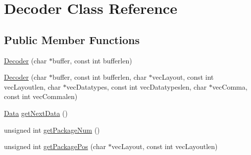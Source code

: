 \hypertarget{classDecoder}{\section{Decoder Class Reference}
\label{classDecoder}
}
\subsection*{Public Member Functions}
\begin{DoxyCompactItemize}
\item 
\hyperlink{classDecoder_a26cf61527451080d86ac5f876d3d1c21}{Decoder} (char $\ast$buffer, const int bufferlen)
\item 
\hyperlink{classDecoder_aec7e24d0fc7ac86886fc7f5de4999ed5}{Decoder} (char $\ast$buffer, const int bufferlen, char $\ast$vec\-Layout, const int vec\-Layoutlen, char $\ast$vec\-Datatypes, const int vec\-Datatypeslen, char $\ast$vec\-Comma, const int vec\-Commalen)
\item 
\hyperlink{classData}{Data} \hyperlink{classDecoder_a822e353ce4fda29290f280d4e3e44305}{get\-Next\-Data} ()
\item 
unsigned int \hyperlink{classDecoder_a28231d06fe2fd5144a939907d6ee509a}{get\-Package\-Num} ()
\item 
unsigned int \hyperlink{classDecoder_aca3dc7a7a1982ac07e1a08a0e4c91955}{get\-Package\-Pos} (char $\ast$vec\-Layout, const int vec\-Layoutlen)
\end{DoxyCompactItemize}


